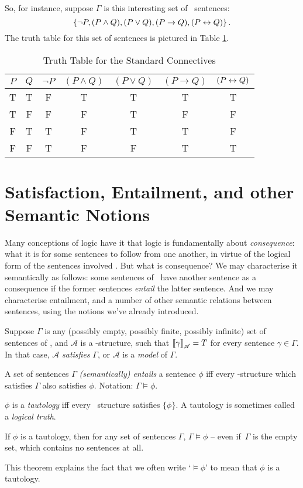 So, for instance, suppose $\Gamma$ is this interesting set of \lone\ sentences: $$\left\{\neg P, (P\wedge Q), (P\vee Q), (P \to Q), (P\leftrightarrow Q)\right\}.$$ The truth table for this set of sentences is pictured in Table \ref{tt}. 

\begin{table}[t]
	\centering
	\begin{tabular}{cc|ccccc}
\toprule
$P$ & $Q$ & $\neg P$ & $(P\wedge Q)$ & $(P\vee Q)$ & $(P \to Q)$ & $(P\leftrightarrow Q)$	\\
\midrule
T & T & F & T & T & T & T \\
T & F & F & F & T & F & F \\
F & T & T & F & T & T & F \\
F & F & T & F & F & T & T \\
\bottomrule
	\end{tabular}
	\caption{Truth Table for the Standard Connectives\label{tt}}
\end{table}


\section{Satisfaction, Entailment, and other Semantic Notions}\label{sec:satisf}

Many conceptions of logic have it that logic is fundamentally about \emph{consequence}: what it is for some sentences to follow from one another, in virtue of the logical form of the sentences involved \citep{brlc}. But what is consequence? We may characterise it semantically as follows: some sentences of \lone\ have another sentence as a consequence if the former sentences \emph{entail} the latter sentence. And we may characterise entailment, and a number of other semantic relations between sentences, using the notions we've already introduced.
\begin{definition}[Satisfaction]
	Suppose $\Gamma$ is any (possibly empty, possibly finite, possibly infinite) set of sentences of \lone, and $\mathscr{A}$ is a \lone-structure, such that $\left\llbracket \gamma\right\rrbracket_{\mathscr{A}}=T$ for every sentence $\gamma\in\Gamma$. In that case, $\mathscr{A}$ \emph{satisfies} $\Gamma$, or $\mathscr{A}$ is a \emph{model} of $\Gamma$.	
	\end{definition}
\begin{definition}[Entailment]
	A set of sentences $\Gamma$ \emph{(semantically) entails} a sentence $\phi$ iff every \lone-structure which satisfies $\Gamma$ also satisfies $\phi$. Notation: $\Gamma \vDash \phi$.
\end{definition}
\begin{definition}[Tautology]		
	$\phi$ is a \emph{tautology} iff every \lone\ structure satisfies $\{\phi\}$. A tautology is sometimes called a \emph{logical truth}. 
\end{definition}
\begin{theorem}
	If $\phi$ is a tautology, then for any set of sentences $\Gamma$, $\Gamma \vDash \phi$ – even if \,$\Gamma$ is the empty set, which contains no sentences at all.
\end{theorem}
This theorem explains the fact that we often write `$\vDash \phi$' to mean that $\phi$ is a tautology.

